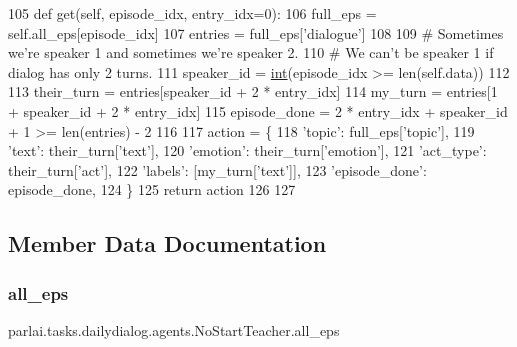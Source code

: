 \begin{DoxyCode}
105     \textcolor{keyword}{def }get(self, episode\_idx, entry\_idx=0):
106         full\_eps = self.all\_eps[episode\_idx]
107         entries = full\_eps[\textcolor{stringliteral}{'dialogue'}]
108 
109         \textcolor{comment}{# Sometimes we're speaker 1 and sometimes we're speaker 2.}
110         \textcolor{comment}{# We can't be speaker 1 if dialog has only 2 turns.}
111         speaker\_id = \hyperlink{namespacelanguage__model_1_1eval__ppl_a7d12ee00479673c5c8d1f6d01faa272a}{int}(episode\_idx >= len(self.data))
112 
113         their\_turn = entries[speaker\_id + 2 * entry\_idx]
114         my\_turn = entries[1 + speaker\_id + 2 * entry\_idx]
115         episode\_done = 2 * entry\_idx + speaker\_id + 1 >= len(entries) - 2
116 
117         action = \{
118             \textcolor{stringliteral}{'topic'}: full\_eps[\textcolor{stringliteral}{'topic'}],
119             \textcolor{stringliteral}{'text'}: their\_turn[\textcolor{stringliteral}{'text'}],
120             \textcolor{stringliteral}{'emotion'}: their\_turn[\textcolor{stringliteral}{'emotion'}],
121             \textcolor{stringliteral}{'act\_type'}: their\_turn[\textcolor{stringliteral}{'act'}],
122             \textcolor{stringliteral}{'labels'}: [my\_turn[\textcolor{stringliteral}{'text'}]],
123             \textcolor{stringliteral}{'episode\_done'}: episode\_done,
124         \}
125         \textcolor{keywordflow}{return} action
126 
127 
\end{DoxyCode}


\subsection{Member Data Documentation}
\mbox{\label{classparlai_1_1tasks_1_1dailydialog_1_1agents_1_1NoStartTeacher_adb1dd6164639fbe3d4bf53a26f0431ee}} 
\subsubsection{\texorpdfstring{all\+\_\+eps}{all\_eps}}
{\footnotesize\ttfamily parlai.\+tasks.\+dailydialog.\+agents.\+No\+Start\+Teacher.\+all\+\_\+eps}



